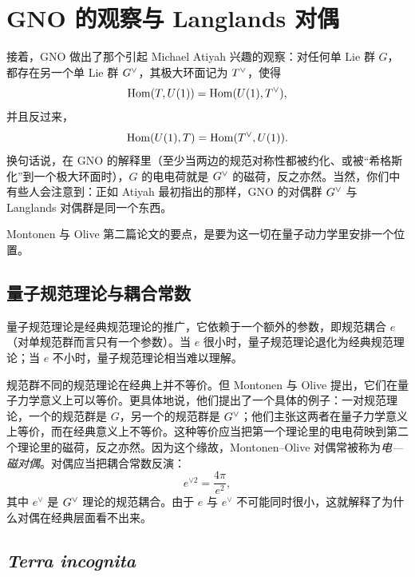 \section{GNO 的观察与 Langlands 对偶}

\par\medskip

接着，GNO 做出了那个引起 Michael Atiyah 兴趣的观察：对任何单 Lie 群 $G$，都存在另一个单 Lie 群 $G^{\vee}$，其极大环面记为 $T^{\vee}$，使得
\[
  \operatorname{Hom}(T,U(1))=\operatorname{Hom}(U(1),T^{\vee}),
\]
并且反过来，
\[
  \operatorname{Hom}(U(1),T)=\operatorname{Hom}(T^{\vee},U(1)).
\]
换句话说，在 GNO 的解释里（至少当两边的规范对称性都被约化、或被“希格斯化”到一个极大环面时），$G$ 的电电荷就是 $G^{\vee}$ 的磁荷，反之亦然。当然，你们中有些人会注意到：正如 Atiyah 最初指出的那样，GNO 的对偶群 $G^{\vee}$ 与 Langlands 对偶群是同一个东西。

Montonen 与 Olive 第二篇论文的要点，是要为这一切在量子动力学里安排一个位置。

\subsection{量子规范理论与耦合常数}

量子规范理论是经典规范理论的推广，它依赖于一个额外的参数，即规范耦合 $e$（对单规范群而言只有一个参数）。当 $e$ 很小时，量子规范理论退化为经典规范理论；当 $e$ 不小时，量子规范理论相当难以理解。

规范群不同的规范理论在经典上并不等价。但 Montonen 与 Olive 提出，它们在量子力学意义上可以等价。更具体地说，他们提出了一个具体的例子：一对规范理论，一个的规范群是 $G$，另一个的规范群是 $G^{\vee}$；他们主张这两者在量子力学意义上等价，而在经典意义上不等价。这种等价应当把第一个理论里的电电荷映到第二个理论里的磁荷，反之亦然。因为这个缘故，Montonen--Olive 对偶常被称为\emph{电—磁对偶}。对偶应当把耦合常数反演：
\begin{equation}
  e^{\vee 2}=\frac{4\pi}{e^2},
  \label{eq:coupling}
\end{equation}
其中 $e^\vee$ 是 $G^{\vee}$ 理论的规范耦合。由于 $e$ 与 $e^\vee$ 不可能同时很小，这就解释了为什么对偶在经典层面看不出来。

\subsection{\emph{Terra incognita}}

